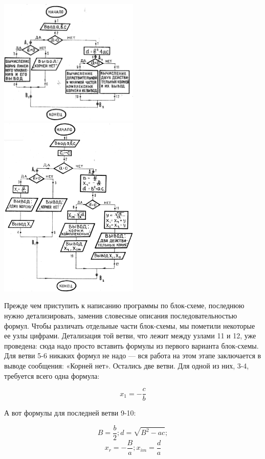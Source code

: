 \documentclass[11pt,a4paper,oneside]{article}
\begin{document}
\includegraphics[width=0.5\textwidth]{sqroot_algo1}
\includegraphics[width=0.5\textwidth]{sqroot_algo2}

Прежде чем приступить к написанию программы по блок-схеме, последнюю нужно детализировать, заменив словесные описания последовательностью формул. Чтобы различать отдельные части блок-схемы, мы пометили некоторые ее узлы цифрами. Детализация той ветви, что лежит между узлами 11 и 12, уже проведена: сюда надо просто вставить формулы из первого варианта блок-схемы. Для ветви 5-6 никаких формул не надо — вся работа на этом этапе заключается в выводе сообщения: «Корней нет». Остались две ветви. Для одной из них, 3-4, требуется всего одна формула:

\begin{equation}
x_{1}=-\frac{c}{b}
\end{equation}

А вот формулы для последней ветви 9-10:

\begin{equation}
B=\frac{b}{2}; d=\sqrt{B^{2}-ac};
\end{equation}
\begin{equation}
x_{r}=-\frac{B}{a}; x_{im}=\frac{d}{a}
\end{equation}
\end{document}

